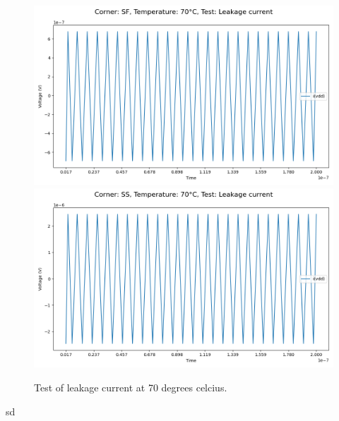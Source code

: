 \begin{figure}[H]
    \vspace{5pt}
    \includegraphics[height= 0.21\textheight]{figures/aimspice/SF/70/I.csv.png}
    \vspace{5pt}
    \includegraphics[height= 0.21\textheight]{figures/aimspice/SS/70/I.csv.png}
    \caption{Test of leakage current at 70 degrees celcius.}
    \label{fig:aimspice_I_70}
\end{figure}

sd